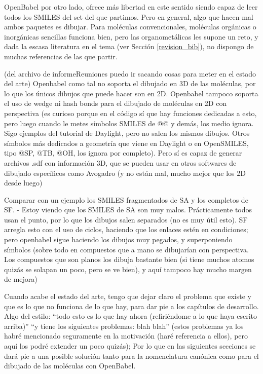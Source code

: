 OpenBabel por otro lado, ofrece más libertad en este sentido siendo capaz de leer todos los SMILES del set del que partimos. Pero en general, algo que hacen mal ambos paquetes es dibujar. Para moléculas convencionales, moléculas orgánicas o inorgánicas sencillas funciona bien, pero las organometálicas les supone un reto, y dada la escasa literatura en el tema (ver Sección \ref{revision_bib}), no dispongo de muchas referencias de las que partir.




(del archivo de informeReuniones puedo ir sacando cosas para meter en el estado del arte) Openbabel como tal no soporta el dibujado en 3D de las moléculas, por lo que los únicos dibujos que puede hacer son en 2D. Openbabel tampoco soporta el uso de wedge ni hash bonds para el dibujado de moléculas en 2D con perspectiva (es curioso porque en el código sí que hay funciones dedicadas a esto, pero luego cuando le metes símbolos SMILES de @@ y demás, los medio ignora. Sigo ejemplos del tutorial de Daylight, pero no salen los mismos dibujos. Otros símbolos más dedicados a geometría que viene en Daylight o en OpenSMILES, tipo @SP, @TB, @OH, los ignora por completo). Pero sí es capaz de generar archivos .sdf con información 3D, que se pueden usar en otros softwares de dibujado específicos como Avogadro (y no están mal, mucho mejor que los 2D desde luego)

Comparar con un ejemplo los SMILES fragmentados de SA y los completos de SF.
-	Estoy viendo que los SMILES de SA son muy malos. Prácticamente todos usan el punto, por lo que los dibujos salen separados (no es muy útil esto). SF arregla esto con el uso de ciclos, haciendo que los enlaces estén en condiciones; pero openbabel sigue haciendo los dibujos muy pegados, y superponiendo símbolos (sobre todo en compuestos que a mano se dibujarían con perspectiva. Los compuestos que son planos los dibuja bastante bien (si tiene muchos atomos quizás se solapan un poco, pero se ve bien), y aquí tampoco hay mucho margen de mejora)





\bigskip

Cuando acabe el estado del arte, tengo que dejar claro el problema que existe y que es lo que no funciona de lo que hay, para dar pie a los capítulos de desarrollo. Algo del estilo: “todo esto es lo que hay ahora (refiriéndome a lo que haya escrito arriba)” \bigskip “y tiene los siguientes problemas: blah blah” (estos problemas ya los habré mencionado seguramente en la motivación (haré referencia a ellos), pero aquí los podré extender un poco quizás); Por lo que en las siguientes secciones se dará pie a una posible solución tanto para la nomenclatura canónica como para el dibujado de las moléculas con OpenBabel.




